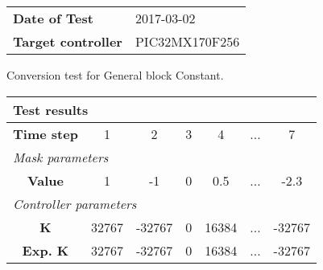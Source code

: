 \begin{tabular}{l l}
\textbf{Date of Test} & 2017-03-02 \tabularnewline
\textbf{Target controller} & PIC32MX170F256 \tabularnewline
\end{tabular}
\vspace{1ex}
Conversion test for General block Constant.

\vspace{1em}
\begin{tabularx}{\textwidth}{|c|c|c|c|c|>{\centering\arraybackslash}X|c|}
\hline
\multicolumn{7}{|l|}{\cellcolor[gray]{0.8}\textbf{Test results}} \tabularnewline \hline
\textbf{Time step} & 1 & 2 & 3 & 4 & ... & 7 \tabularnewline \hline
\multicolumn{7}{|l|}{\cellcolor[gray]{0.9}\textit{Mask parameters}} \tabularnewline \hline
\textbf{Value} & 1 & -1 & 0 & 0.5 & ... & -2.3 \tabularnewline \hline
\multicolumn{7}{|l|}{\cellcolor[gray]{0.9}\textit{Controller parameters}} \tabularnewline \hline
\textbf{K} & 32767 & -32767 & 0 & 16384 & ... & -32767 \tabularnewline \hline
\textbf{Exp. K} & 32767 & -32767 & 0 & 16384 & ... & -32767 \tabularnewline \hline
\end{tabularx}
\vspace{1ex}
